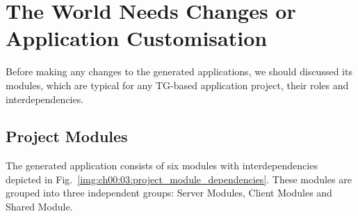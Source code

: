 \chapter{The World Needs Changes or Application Customisation}\label{ch00:03}


  Before making any changes to the generated applications, we should discussed its modules, which are typical for any TG-based application project, their roles and interdependencies.

\section{Project Modules}
  The generated application consists of six modules with interdependencies depicted in Fig.~\ref{img:ch00:03:project_module_dependencies}.
  These modules are grouped into three independent groups: Server Modules, Client Modules and Shared Module.
  
